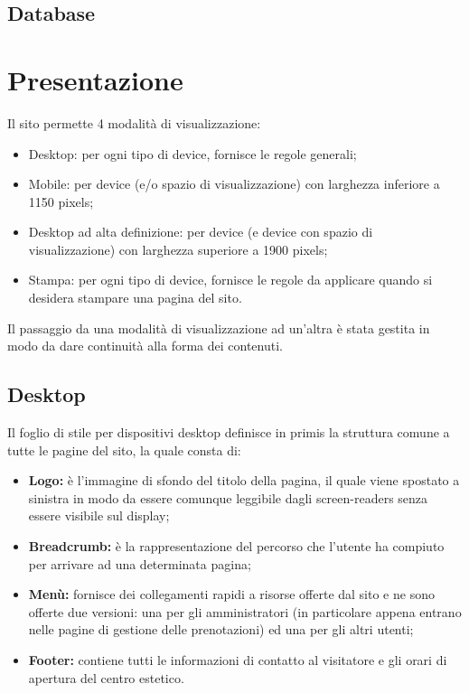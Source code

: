 \documentclass[]{article}
\begin{document}
\subsection{Database}

\section{Presentazione}
Il sito permette 4 modalità di visualizzazione:
\begin{itemize}
	\item Desktop: per ogni tipo di device, fornisce le regole generali;
	\item Mobile: per device (e/o spazio di visualizzazione) con larghezza inferiore a 1150 pixels;
	\item Desktop ad alta definizione: per device (e device con spazio di visualizzazione) con larghezza superiore a 1900 pixels;
	\item Stampa: per ogni tipo di device, fornisce le regole da applicare quando si desidera stampare una pagina del sito.
\end{itemize}
Il passaggio da una modalità di visualizzazione ad un'altra è stata gestita in modo da dare continuità alla forma dei contenuti.

\subsection{Desktop}
Il foglio di stile per dispositivi desktop definisce in primis la struttura comune a tutte le pagine del sito, la quale consta di:
\begin{itemize}
	\item \textbf{Logo:} è l'immagine di sfondo del titolo della pagina, il quale viene spostato a sinistra in modo da essere comunque leggibile dagli screen-readers senza essere visibile sul display;
	\item \textbf{Breadcrumb:} è la rappresentazione del percorso che l'utente ha compiuto per arrivare ad una determinata pagina;
	\item \textbf{Menù:} fornisce dei collegamenti rapidi a risorse offerte dal sito e ne sono offerte due versioni: una per gli amministratori (in particolare appena entrano nelle pagine di gestione delle prenotazioni) ed una per gli altri utenti;
	\item \textbf{Footer:} contiene tutti le informazioni di contatto al visitatore e gli orari di apertura del centro estetico.
\end{itemize}
\end{document}
